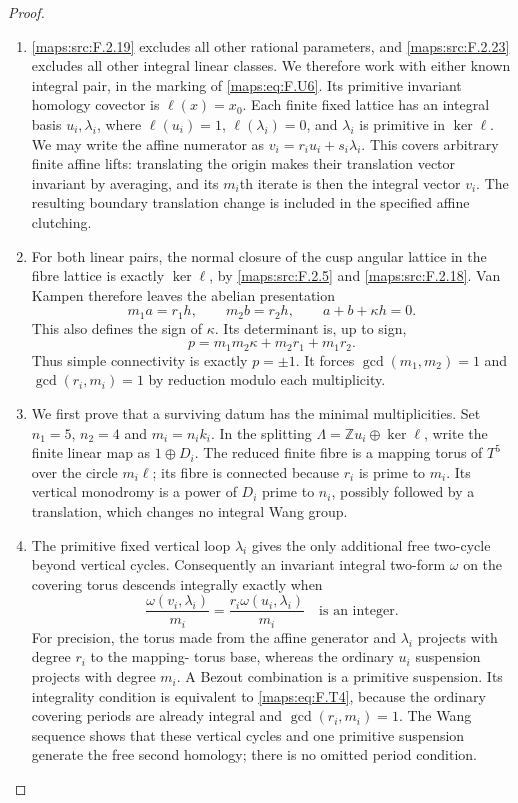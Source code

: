\documentclass[11pt,a4paper]{article}
\theoremstyle{definition}
\begin{document}
\begin{proof}
\begin{enumerate}[label=\arabic*.]
\item \ref{maps:src:F.2.19} excludes all other rational parameters, and \ref{maps:src:F.2.23}
excludes all other integral linear classes.
We therefore work with either known integral pair, in the
marking of \eqref{maps:eq:F.U6}.  Its primitive invariant homology
covector is $\ell(x)=x_0$.
Each finite fixed lattice has an integral basis
$u_i,\lambda_i$, where $\ell(u_i)=1$,
$\ell(\lambda_i)=0$, and $\lambda_i$ is primitive in
$\ker\ell$.
We may write the affine numerator as
$v_i=r_i u_i+s_i\lambda_i$.
This covers arbitrary finite affine lifts: translating the
origin makes their translation vector invariant by averaging,
and its $m_i$th iterate is then the integral vector $v_i$.
The resulting boundary translation change is included in the
specified affine clutching.

\item For both linear pairs, the normal closure of the cusp angular
lattice in the fibre lattice is exactly $\ker\ell$, by
\ref{maps:src:F.2.5} and \ref{maps:src:F.2.18}.  Van Kampen therefore leaves the abelian
presentation
\[
 m_1a=r_1h,\qquad m_2b=r_2h,\qquad
 a+b+\kappa h=0.
 \tag{F.T2}\label{maps:eq:F.T2}
\]
This also defines the sign of $\kappa$.
Its determinant is, up to sign,
\[
 p=m_1m_2\kappa+m_2r_1+m_1r_2.
 \tag{F.T3}\label{maps:eq:F.T3}
\]
Thus simple connectivity is exactly $p=\pm1$.
It forces $\gcd(m_1,m_2)=1$ and
$\gcd(r_i,m_i)=1$ by reduction modulo each multiplicity.

\item We first prove that a surviving datum has the minimal
multiplicities.  Set $n_1=5$, $n_2=4$ and $m_i=n_i k_i$.
In the splitting $\Lambda=\mathbb Zu_i\oplus\ker\ell$,
write the finite linear map as $1\oplus D_i$.
The reduced finite fibre is a mapping torus of $T^5$ over
the circle $m_i\ell$; its fibre is connected because
$r_i$ is prime to $m_i$.
Its vertical monodromy is a power of $D_i$ prime to $n_i$,
possibly followed by a translation, which changes no
integral Wang group.

\item The primitive fixed vertical loop $\lambda_i$ gives the
only additional free two-cycle beyond vertical cycles.
Consequently an invariant integral two-form $\omega$ on
the covering torus descends integrally exactly when
\[
 \frac{\omega(v_i,\lambda_i)}{m_i}
       =\frac{r_i\omega(u_i,\lambda_i)}{m_i}
       \quad\text{is an integer}.
 \tag{F.T4}\label{maps:eq:F.T4}
\]
For precision, the torus made from the affine generator
and $\lambda_i$ projects with degree $r_i$ to the mapping-
torus base, whereas the ordinary $u_i$ suspension projects
with degree $m_i$.  A Bezout combination is a primitive
suspension.  Its integrality condition is equivalent to
\eqref{maps:eq:F.T4}, because the ordinary covering periods are already
integral and $\gcd(r_i,m_i)=1$.
The Wang sequence shows that these vertical cycles and one
primitive suspension generate the free second homology;
there is no omitted period condition.


\end{enumerate}
\end{proof}
\end{document}
